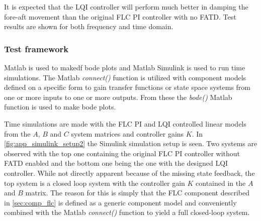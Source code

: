 It is expected that the LQI controller will perform much better in damping the fore-aft movement than the original FLC PI controller with no FATD. Test results are shown for both frequency and time domain.


\subsubsection{Test framework}
Matlab is used to makedf bode plots and Matlab Simulink is used to run time simulations. The Matlab \textit{connect()} function is utilized with component models defined on a specific form to gain transfer functions or state space systems from one or more inputs to one or more outputs. From these the \textit{bode()} Matlab function is used to make bode plots. 

Time simulations are made with the FLC PI and LQI controlled linear models from the $ A $, $ B $ and $ C $ system matrices and controller gains $ K $. In \cref{fig:app_simulink_setup2} the Simulink simulation setup is seen. Two systems are observed with the top one containing the original FLC PI controller without FATD enabled and the bottom one being the one with the designed LQI controller. While not directly apparent because of the missing state feedback, the top system is a closed loop system with the controller gain $ K $ contained in the $ A $ and $ B $ matrix. The reason for this is simply that the FLC component described in \cref{sec:comp_flc} is defined as a generic component model and conveniently combined with the Matlab \textit{connect()} function to yield a full closed-loop system.

